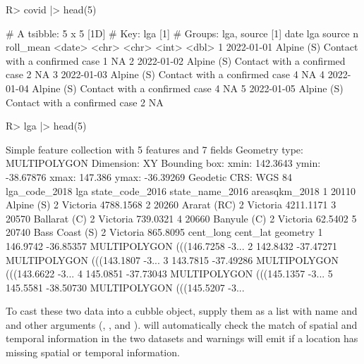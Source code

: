 \documentclass[
]{jss}
\begin{document}
\begin{CodeChunk}
\begin{CodeInput}
R> covid |> head(5)
\end{CodeInput}
\begin{CodeOutput}
# A tsibble: 5 x 5 [1D]
# Key:       lga [1]
# Groups:    lga, source [1]
  date       lga        source                            n roll_mean
  <date>     <chr>      <chr>                         <int>     <dbl>
1 2022-01-01 Alpine (S) Contact with a confirmed case     1        NA
2 2022-01-02 Alpine (S) Contact with a confirmed case     2        NA
3 2022-01-03 Alpine (S) Contact with a confirmed case     4        NA
4 2022-01-04 Alpine (S) Contact with a confirmed case     4        NA
5 2022-01-05 Alpine (S) Contact with a confirmed case     2        NA
\end{CodeOutput}
\begin{CodeInput}
R> lga |> head(5)
\end{CodeInput}
\begin{CodeOutput}
Simple feature collection with 5 features and 7 fields
Geometry type: MULTIPOLYGON
Dimension:     XY
Bounding box:  xmin: 142.3643 ymin: -38.67876 xmax: 147.386 ymax: -36.39269
Geodetic CRS:  WGS 84
  lga_code_2018            lga state_code_2016 state_name_2016 areasqkm_2018
1         20110     Alpine (S)               2        Victoria     4788.1568
2         20260    Ararat (RC)               2        Victoria     4211.1171
3         20570   Ballarat (C)               2        Victoria      739.0321
4         20660    Banyule (C)               2        Victoria       62.5402
5         20740 Bass Coast (S)               2        Victoria      865.8095
  cent_long  cent_lat                       geometry
1  146.9742 -36.85357 MULTIPOLYGON (((146.7258 -3...
2  142.8432 -37.47271 MULTIPOLYGON (((143.1807 -3...
3  143.7815 -37.49286 MULTIPOLYGON (((143.6622 -3...
4  145.0851 -37.73043 MULTIPOLYGON (((145.1357 -3...
5  145.5581 -38.50730 MULTIPOLYGON (((145.5207 -3...
\end{CodeOutput}
\end{CodeChunk}

To cast these two data into a cubble object, supply them as a list with name  and  and other arguments (, , and ).  will automatically check the match of spatial and temporal information in the two datasets and warnings will emit if a location has missing spatial or temporal information.
\end{document}
